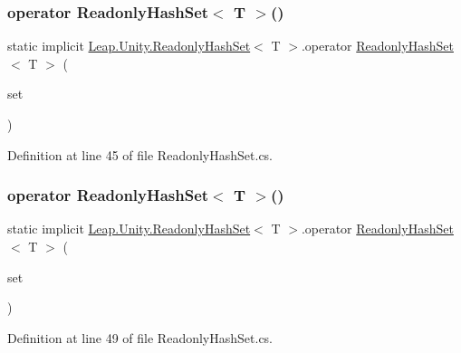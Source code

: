 \subsubsection{\texorpdfstring{operator ReadonlyHashSet$<$ T $>$()}{operator ReadonlyHashSet< T >()}\hspace{0.1cm}{\footnotesize\ttfamily [1/2]}}
{\footnotesize\ttfamily static implicit \mbox{\hyperlink{struct_leap_1_1_unity_1_1_readonly_hash_set}{Leap.\+Unity.\+Readonly\+Hash\+Set}}$<$ T $>$.operator \mbox{\hyperlink{struct_leap_1_1_unity_1_1_readonly_hash_set}{Readonly\+Hash\+Set}}$<$ T $>$ (\begin{DoxyParamCaption}\item[{Hash\+Set$<$ T $>$}]{set }\end{DoxyParamCaption})\hspace{0.3cm}{\ttfamily [static]}}



Definition at line 45 of file Readonly\+Hash\+Set.\+cs.

\mbox{\label{struct_leap_1_1_unity_1_1_readonly_hash_set_ac61ad56b6aaddcc9b9ac924e4e1bb737}} 
\subsubsection{\texorpdfstring{operator ReadonlyHashSet$<$ T $>$()}{operator ReadonlyHashSet< T >()}\hspace{0.1cm}{\footnotesize\ttfamily [2/2]}}
{\footnotesize\ttfamily static implicit \mbox{\hyperlink{struct_leap_1_1_unity_1_1_readonly_hash_set}{Leap.\+Unity.\+Readonly\+Hash\+Set}}$<$ T $>$.operator \mbox{\hyperlink{struct_leap_1_1_unity_1_1_readonly_hash_set}{Readonly\+Hash\+Set}}$<$ T $>$ (\begin{DoxyParamCaption}\item[{\mbox{\hyperlink{class_leap_1_1_unity_1_1_serializable_hash_set}{Serializable\+Hash\+Set}}$<$ T $>$}]{set }\end{DoxyParamCaption})\hspace{0.3cm}{\ttfamily [static]}}



Definition at line 49 of file Readonly\+Hash\+Set.\+cs.


